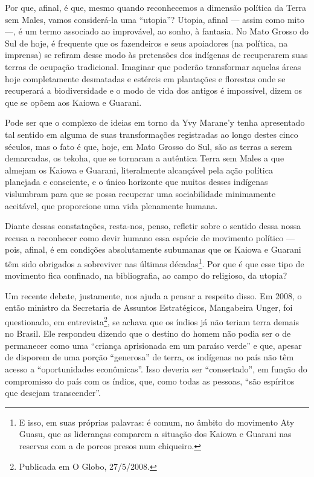 Por que, afinal, é que, mesmo quando reconhecemos a dimensão política da
Terra sem Males, vamos considerá-la uma ``utopia''? Utopia, afinal ---
assim como mito ---, é um termo associado ao improvável, ao sonho, à
fantasia. No Mato Grosso do Sul de hoje, é frequente que os fazendeiros
e seus apoiadores (na política, na imprensa) se refiram desse modo às
pretensões dos indígenas de recuperarem suas terras de ocupação
tradicional. Imaginar que poderão transformar aquelas áreas hoje
completamente desmatadas e estéreis em plantações e florestas onde se
recuperará a biodiversidade e o modo de vida dos antigos é impossível,
dizem os que se opõem aos Kaiowa e Guarani.

Pode ser que o complexo de ideias em torno da Yvy Marane’y tenha
apresentado tal sentido em alguma de suas transformações registradas ao
longo destes cinco séculos, mas o fato é que, hoje, em Mato Grosso do
Sul, são as terras a serem demarcadas, os tekoha, que se tornaram a
autêntica Terra sem Males a que almejam os Kaiowa e Guarani,
literalmente alcançável pela ação política planejada e consciente, e o
único horizonte que muitos desses indígenas vislumbram para que se
possa recuperar uma sociabilidade minimamente aceitável, que
proporcione uma vida plenamente humana.

Diante dessas constatações, resta-nos, penso, refletir sobre o sentido
dessa nossa recusa a reconhecer como devir humano essa espécie de
movimento político --- pois, afinal, é em condições absolutamente
subumanas que os Kaiowa e Guarani têm sido obrigados a sobreviver nas
últimas décadas\footnote{E isso, em suas próprias palavras: é comum, no
âmbito do movimento Aty Guasu, que as lideranças comparem a situação
dos Kaiowa e Guarani nas reservas com a de porcos presos num
chiqueiro.}. Por que é que esse tipo de movimento fica confinado, na
bibliografia, ao campo do religioso, da utopia?

Um recente debate, justamente, nos ajuda a pensar a respeito disso. Em
2008, o então ministro da Secretaria de Assuntos Estratégicos,
Mangabeira Unger, foi questionado, em entrevista\footnote{Publicada em
O Globo, 27/5/2008.}, se achava que os índios já não teriam terra
demais no Brasil. Ele respondeu dizendo que o destino do homem não
podia ser o de permanecer como uma ``criança aprisionada em um paraíso
verde'' e que, apesar de disporem de uma porção ``generosa'' de terra, os
indígenas no país não têm acesso a ``oportunidades econômicas''. Isso
deveria ser ``consertado'', em função do compromisso do país com os
índios, que, como todas as pessoas, ``são espíritos que desejam
transcender''.

